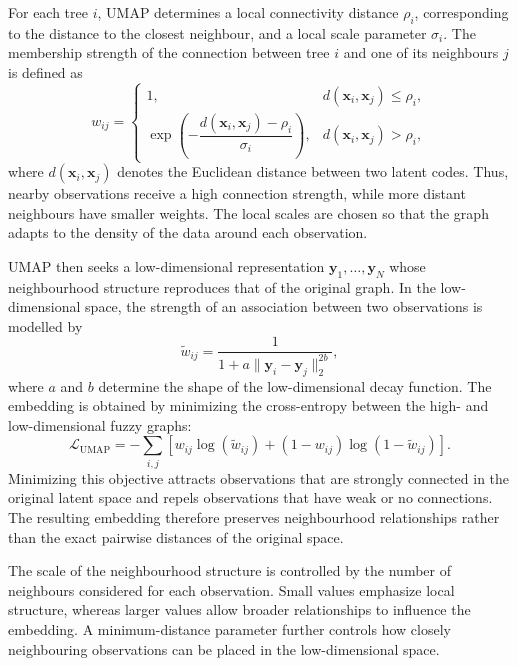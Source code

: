 For each tree $i$, UMAP determines a local connectivity distance $\rho_i$, corresponding to the
distance to the closest neighbour, and a local scale parameter $\sigma_i$. The membership strength
of the connection between tree $i$ and one of its neighbours $j$ is defined as
\begin{equation}
    w_{ij} =
    \begin{cases}
        1, & d(\mathbf{x}_i,\mathbf{x}_j) \leq \rho_i,\\[4pt]
        \exp\!\left(
        -\dfrac{d(\mathbf{x}_i,\mathbf{x}_j)-\rho_i}{\sigma_i}
        \right),
        & d(\mathbf{x}_i,\mathbf{x}_j) > \rho_i,
    \end{cases}
    \label{eq:umap_weight}
\end{equation}
where $d(\mathbf{x}_i,\mathbf{x}_j)$ denotes the Euclidean distance between two latent codes.
Thus, nearby observations receive a high connection strength, while more distant neighbours have
smaller weights. The local scales are chosen so that the graph adapts to the density of the data
around each observation.

UMAP then seeks a low-dimensional representation
$\mathbf{y}_1,\ldots,\mathbf{y}_N$ whose neighbourhood structure reproduces that of the original
graph. In the low-dimensional space, the strength of an association between two observations is
modelled by
\begin{equation}
    \tilde{w}_{ij}
    =
    \frac{1}
    {1+a\|\mathbf{y}_i-\mathbf{y}_j\|_2^{2b}},
    \label{eq:umap_lowdim}
\end{equation}
where $a$ and $b$ determine the shape of the low-dimensional decay function. The embedding is
obtained by minimizing the cross-entropy between the high- and low-dimensional fuzzy graphs:
\begin{equation}
    \mathcal{L}_{\mathrm{UMAP}}
    =
    -\sum_{i,j}
    \left[
        w_{ij}\log(\tilde{w}_{ij})
        +
        (1-w_{ij})\log(1-\tilde{w}_{ij})
    \right].
    \label{eq:umap_loss}
\end{equation}
Minimizing this objective attracts observations that are strongly connected in the original
latent space and repels observations that have weak or no connections. The resulting embedding
therefore preserves neighbourhood relationships rather than the exact pairwise distances of the
original space.

The scale of the neighbourhood structure is controlled by the number of neighbours considered for
each observation. Small values emphasize local structure, whereas larger values allow broader
relationships to influence the embedding. A minimum-distance parameter further controls how
closely neighbouring observations can be placed in the low-dimensional space.

